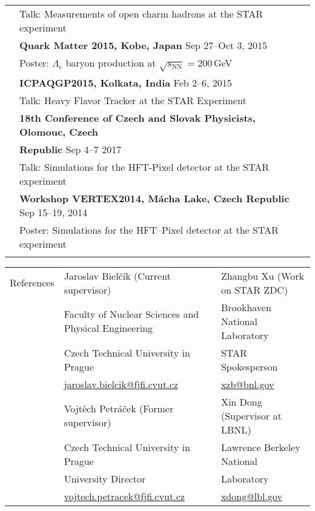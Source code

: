 \documentclass[letterpaper,11pt,oneside]{article}
\begin{document}
\begin{tabular}{@{} l l}
     & Talk: Measurements of open charm hadrons at the STAR experiment \\[.2cm]
     & \textbf{Quark Matter 2015, Kobe, Japan} Sep 27--Oct 3, 2015\\
     & Poster: $\Lambda_\mathrm{c}$ baryon production at $\sqrt{s_\mathrm{NN}} = 200\,$GeV \\[.2cm]
     & \textbf{ICPAQGP2015, Kolkata, India} Feb 2--6, 2015\\
     & Talk: Heavy Flavor Tracker at the STAR Experiment \\[.2cm]
     & \textbf{18th Conference of Czech and Slovak Physicists, Olomouc, Czech} \\
     & \textbf{Republic} Sep 4--7 2017 \\
     & Talk: Simulations for the HFT-Pixel detector at the STAR experiment\\[.2cm]
     & \textbf{Workshop VERTEX2014, Mácha Lake, Czech Republic} Sep 15--19, 2014\\
     & Poster: Simulations for the HFT–Pixel detector at the STAR experiment \\
     & \\
\end{tabular}

\noindent \begin{tabular}{@{} l l l}
 \Large{References} & Jaroslav Bielčík (Current supervisor)& Zhangbu Xu (Work on STAR ZDC) \\
 & Faculty of Nuclear Sciences and Physical Engineering &  Brookhaven National Laboratory  \\
 & Czech Technical University in Prague &  STAR Spokesperson \\
 & \small{\href{mailto:jaroslav.bielcik@fjfi.cvut.cz}{jaroslav.bielcik@fjfi.cvut.cz}} & \small{\href{mailto:xzb@bnl.gov}{xzb@bnl.gov}} \\[.2cm]
 & Vojtěch Petráček (Former supervisor)  &  Xin Dong (Supervisor at LBNL) \\
 & Czech Technical University in Prague  &  Lawrence Berkeley National \\
 & University Director &  Laboratory \\
 & \small{\href{mailto:vojtech.petracek@fjfi.cvut.cz}{vojtech.petracek@fjfi.cvut.cz}} & \small{\href{mailto:xdong@lbl.gov}{xdong@lbl.gov}} \\
\end{tabular}
\end{document}
